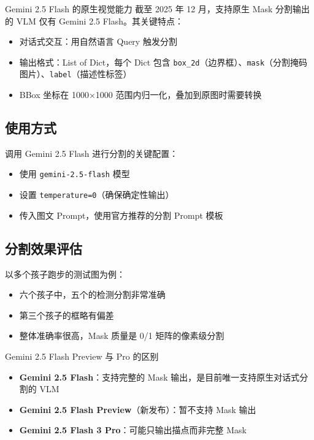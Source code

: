 \documentclass[a4paper]{article}
\begin{document}
\begin{importantbox}{Gemini 2.5 Flash 的原生视觉能力}
截至 2025 年 12 月，支持原生 Mask 分割输出的 VLM 仅有 Gemini 2.5 Flash。其关键特点：
\begin{itemize}
    \item 对话式交互：用自然语言 Query 触发分割
    \item 输出格式：List of Dict，每个 Dict 包含 \texttt{box\_2d}（边界框）、\texttt{mask}（分割掩码图片）、\texttt{label}（描述性标签）
    \item BBox 坐标在 1000×1000 范围内归一化，叠加到原图时需要转换
\end{itemize}
\end{importantbox}

\subsection{使用方式}

调用 Gemini 2.5 Flash 进行分割的关键配置：

\begin{itemize}
    \item 使用 \texttt{gemini-2.5-flash} 模型
    \item 设置 \texttt{temperature=0}（确保确定性输出）
    \item 传入图文 Prompt，使用官方推荐的分割 Prompt 模板
\end{itemize}

\subsection{分割效果评估}

以多个孩子跑步的测试图为例：
\begin{itemize}
    \item 六个孩子中，五个的检测分割非常准确
    \item 第三个孩子的框略有偏差
    \item 整体准确率很高，Mask 质量是 0/1 矩阵的像素级分割
\end{itemize}

\begin{knowledgebox}{Gemini 2.5 Flash Preview 与 Pro 的区别}
\begin{itemize}
    \item \textbf{Gemini 2.5 Flash}：支持完整的 Mask 输出，是目前唯一支持原生对话式分割的 VLM
    \item \textbf{Gemini 2.5 Flash Preview}（新发布）：暂不支持 Mask 输出
    \item \textbf{Gemini 2.5 Flash 3 Pro}：可能只输出描点而非完整 Mask
\end{itemize}
\end{knowledgebox}
\end{document}
